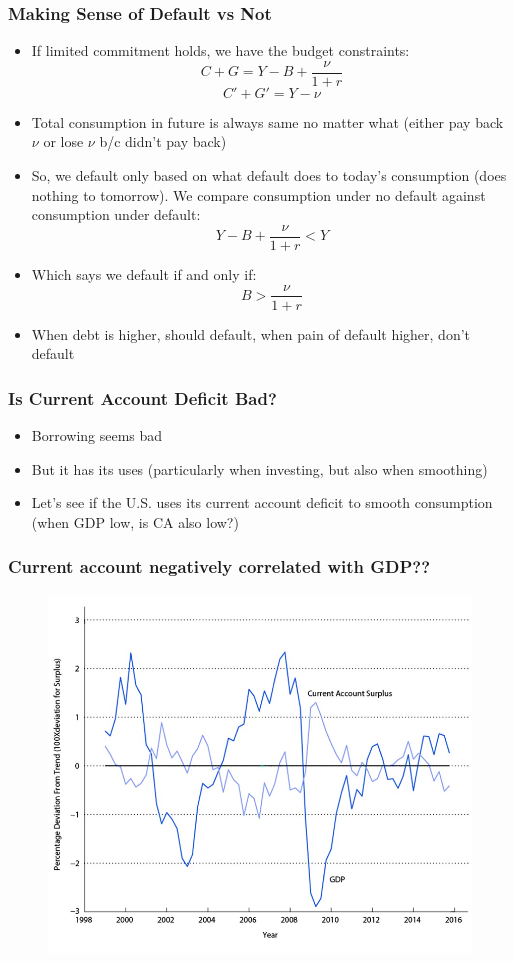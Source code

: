 \documentclass{beamer}
\begin{document}
\begin{frame}
\frametitle[alignment=center]{Making Sense of Default vs Not}
\begin{itemize}
\item If limited commitment holds, we have the budget constraints:
$$C+G=Y-B+\frac{\nu}{1+r}$$
$$C'+G'=Y-\nu$$
\item Total consumption in future is always same no matter what (either pay back $\nu$ or lose $\nu$ b/c didn't pay back)
\bigskip
\item So, we default only based on what default does to today's consumption (does nothing to tomorrow).  We compare consumption under no default against consumption under default:
$$Y-B+\frac{\nu}{1+r}<Y$$
\item Which says we default if and only if:
$$B>\frac{\nu}{1+r}$$
\item When debt is higher, should default, when pain of default higher, don't default
\end{itemize}
\end{frame}




\begin{frame}
\frametitle[alignment=center]{Is Current Account Deficit Bad?}
\begin{itemize}
\item Borrowing seems bad
\bigskip
\item But it has its uses (particularly when investing, but also when smoothing)
\bigskip
\item Let's see if the U.S. uses its current account deficit to smooth consumption (when GDP low, is CA also low?)
\end{itemize}
\end{frame}


\begin{frame}
\frametitle[alignment=center]{Current account negatively correlated with GDP??}
\begin{figure}
\centering
\includegraphics[scale=0.7]{Figures/W_Fig_16pt2.png}
\end{figure}
\end{frame}
\end{document}
